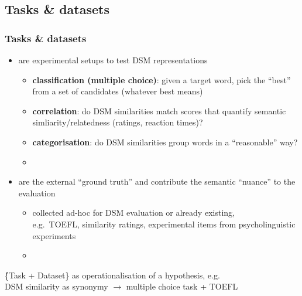 \documentclass[t]{beamer} %
\begin{document}
\subsection{Tasks \& datasets}

\begin{frame}
  \frametitle{Tasks \& datasets}
  \begin{itemize} 
  \item {} are experimental setups to test DSM representations
    \begin{itemize} 
    \item \textbf{classification (multiple choice)}: given a target word, pick the ``best'' from a set of candidates (whatever best means)
    \item \textbf{correlation}: do DSM similarities match scores that quantify semantic simliarity/relatedness (ratings, reaction times)?   
    \item \textbf{categorisation}: do DSM similarities  group words in a ``reasonable'' way?
    \item []
    \end{itemize}
  \item<2->  are the external ``ground truth'' and contribute the semantic ``nuance'' to the evaluation
    \begin{itemize} 
    \item collected ad-hoc for DSM evaluation or already existing,\\
      e.g.\ TOEFL, similarity ratings, experimental items from psycholinguistic experiments
    \item[]
    \end{itemize}
  \end{itemize}
    \h{\{Task + Dataset\} as operationalisation of a hypothesis}, e.g.\\
    DSM similarity as synonymy $\rightarrow$  multiple choice task + TOEFL
\end{frame}
\end{document}
